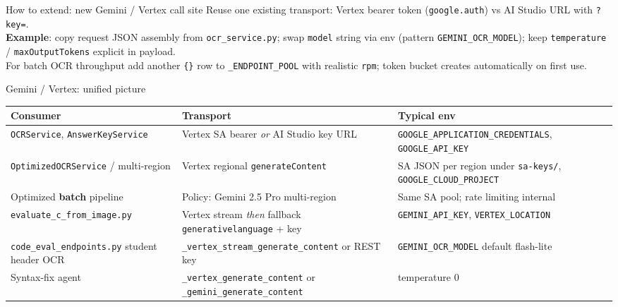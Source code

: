 \documentclass[aspectratio=169]{beamer}
\begin{document}
\begin{frame}{How to extend: new Gemini / Vertex call site}
  \small
  Reuse one existing transport: Vertex bearer token (\texttt{google.auth}) vs AI Studio URL with \texttt{?key=}.\\
  \textbf{Example}: copy request JSON assembly from \texttt{ocr\_service.py}; swap \texttt{model} string via env (pattern \texttt{GEMINI\_OCR\_MODEL}); keep \texttt{temperature} / \texttt{maxOutputTokens} explicit in payload.\\
  For batch OCR throughput add another \texttt{\{\}} row to \texttt{\_ENDPOINT\_POOL} with realistic \texttt{rpm}; token bucket creates automatically on first use.
\end{frame}

\begin{frame}{Gemini / Vertex: unified picture}
  \footnotesize
  \begin{tabular}{@{}p{3.5cm}p{5.3cm}p{4.8cm}@{}}
    \toprule
    Consumer & Transport & Typical env \\
    \midrule
    \texttt{OCRService}, \texttt{AnswerKeyService} & Vertex SA bearer \emph{or} AI Studio key URL & \texttt{GOOGLE\_APPLICATION\_CREDENTIALS}, \texttt{GOOGLE\_API\_KEY} \\
    \texttt{OptimizedOCRService} / multi-region & Vertex regional \texttt{generateContent} & SA JSON per region under \texttt{sa-keys/}, \texttt{GOOGLE\_CLOUD\_PROJECT} \\
    Optimized \textbf{batch} pipeline & Policy: Gemini 2.5 Pro multi-region & Same SA pool; rate limiting internal \\
    \texttt{evaluate\_c\_from\_image.py} & Vertex stream \emph{then} fallback \texttt{generativelanguage} + key & \texttt{GEMINI\_API\_KEY}, \texttt{VERTEX\_LOCATION} \\
    \texttt{code\_eval\_endpoints.py} student header OCR & \texttt{\_vertex\_stream\_generate\_content} or REST key & \texttt{GEMINI\_OCR\_MODEL} default flash-lite \\
    Syntax-fix agent & \texttt{\_vertex\_generate\_content} or \texttt{\_gemini\_generate\_content} & temperature 0 \\
    \bottomrule
  \end{tabular}
\end{frame}
\end{document}
